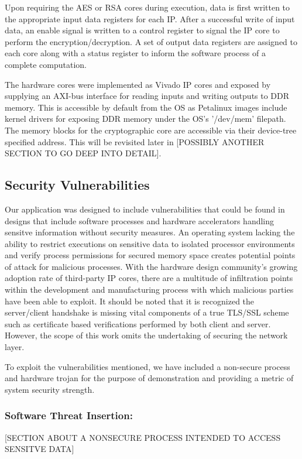 \documentclass[sigconf]{acmart}
\theoremstyle{plain}
\theoremstyle{remark}
\begin{document}
Upon requiring the AES or RSA cores during execution, data is first written to the appropriate input data registers for each IP. After a successful write of input data, an enable signal is written to a control register to signal the IP core to perform the encryption/decryption. A set of output data registers are assigned to each core along with a status register to inform the software process of a complete computation.

The hardware cores were implemented as Vivado IP cores and exposed by supplying an AXI-bus interface for reading inputs and writing outputs to DDR memory. This is accessible by default from the OS as Petalinux images include kernel drivers for exposing DDR memory under the OS's '/dev/mem' filepath. The memory blocks for the cryptographic core are accessible via their device-tree specified address. This will be revisited later in [POSSIBLY ANOTHER SECTION TO GO DEEP INTO DETAIL].




\subsection{Security Vulnerabilities}

Our application was designed to include vulnerabilities that could be found in designs that include software processes and hardware accelerators handling sensitve information without security measures. An operating system lacking the ability to restrict executions on sensitive data to isolated processor environments and verify process permissions for secured memory space creates potential points of attack for malicious processes. With the hardware design community's growing adoption rate of third-party IP cores, there are a multitude of infiltration points within the development and manufacturing process with which malicious parties have been able to exploit. It should be noted that it is recognized the server/client handshake is missing vital components of a true TLS/SSL scheme such as certificate based verifications performed by both client and server. However, the scope of this work omits the undertaking of securing the network layer.

To exploit the vulnerabilities mentioned, we have included a non-secure process and hardware trojan for the purpose of demonstration and providing a metric of system security strength.

\subsubsection{Software Threat Insertion:}
[SECTION ABOUT A NONSECURE PROCESS INTENDED TO ACCESS SENSITVE DATA]
\end{document}
